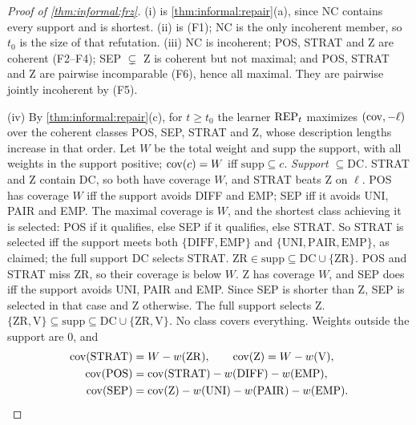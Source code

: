 \begin{proof}[Proof of \cref{thm:informal:frz}]
(i) is \cref{thm:informal:repair}(a), since NC contains every support and is shortest. (ii) is (F1); NC is the only incoherent member, so $t_0$ is the size of that refutation. (iii) NC is incoherent; POS, STRAT and Z are coherent (F2--F4); SEP $\subsetneq$ Z is coherent but not maximal; and POS, STRAT and Z are pairwise incomparable (F6), hence all maximal. They are pairwise jointly incoherent by (F5).

(iv) By \cref{thm:informal:repair}(c), for $t\ge t_0$ the learner $\mathrm{REP}_t$ maximizes $(\mathrm{cov},-\ell)$ over the coherent classes POS, SEP, STRAT and Z, whose description lengths increase in that order. Let $W$ be the total weight and $\mathrm{supp}$ the support, with all weights in the support positive; $\mathrm{cov}(c)=W$ iff $\mathrm{supp}\subseteq c$.
\emph{Support $\subseteq\mathrm{DC}$.} STRAT and Z contain DC, so both have coverage $W$, and STRAT beats Z on $\ell$. POS has coverage $W$ iff the support avoids DIFF and EMP; SEP iff it avoids UNI, PAIR and EMP. The maximal coverage is $W$, and the shortest class achieving it is selected: POS if it qualifies, else SEP if it qualifies, else STRAT. So STRAT is selected iff the support meets both $\{\mathrm{DIFF},\mathrm{EMP}\}$ and $\{\mathrm{UNI},\mathrm{PAIR},\mathrm{EMP}\}$, as claimed; the full support DC selects STRAT.
\emph{$\mathrm{ZR}\in\mathrm{supp}\subseteq\mathrm{DC}\cup\{\mathrm{ZR}\}$.} POS and STRAT miss ZR, so their coverage is below $W$. Z has coverage $W$, and SEP does iff the support avoids UNI, PAIR and EMP. Since SEP is shorter than Z, SEP is selected in that case and Z otherwise. The full support selects Z.
\emph{$\{\mathrm{ZR},\mathrm V\}\subseteq\mathrm{supp}\subseteq\mathrm{DC}\cup\{\mathrm{ZR},\mathrm V\}$.} No class covers everything. Weights outside the support are $0$, and
\begin{align*}
\mathrm{cov}(\mathrm{STRAT})&=W-w(\mathrm{ZR}),\qquad \mathrm{cov}(\mathrm Z)=W-w(\mathrm V),\\
\mathrm{cov}(\mathrm{POS})&=\mathrm{cov}(\mathrm{STRAT})-w(\mathrm{DIFF})-w(\mathrm{EMP}),\\
\mathrm{cov}(\mathrm{SEP})&=\mathrm{cov}(\mathrm Z)-w(\mathrm{UNI})-w(\mathrm{PAIR})-w(\mathrm{EMP}).
\end{align*}

\end{proof}
